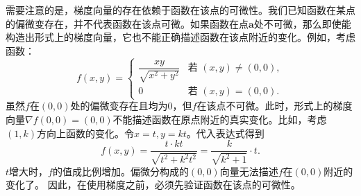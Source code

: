 \documentclass[12pt,UTF8]{ctexbook}
\begin{document}

需要注意的是，梯度向量的存在依赖于函数在该点的可微性。我们已知函数在某点的偏微变存在，并不代表函数在该点可微。如果函数在点$\mathbf{a}$处不可微，那么即使能构造出形式上的梯度向量，它也不能正确描述函数在该点附近的变化。例如，考虑函数：
$$ f(x,y) = \begin{cases}
\dfrac{xy}{\sqrt{x^2+y^2}} & \text{若 } (x,y) \neq (0,0), \\
0 & \text{若 } (x,y) = (0,0).
\end{cases} $$
虽然$f$在$(0,0)$处的偏微变存在且均为$0$，但$f$在该点不可微。此时，形式上的梯度向量$\nabla f(0,0) = (0,0)$不能描述函数在原点附近的真实变化。比如，考虑$(1,k)$方向上函数的变化。令$x = t, y = kt$。代入表达式得到
$$ f(x, y) = \frac{t\cdot kt}{\sqrt{t^2 + k^2t^2}} = \frac{k}{\sqrt{k^2 + 1}}\cdot t.$$
$t$增大时，$f$的值成比例增加。偏微分构成的$(0,0)$向量无法描述$f$在$(0,0)$附近的变化了。
因此，在使用梯度之前，必须先验证函数在该点的可微性。
\end{document}
